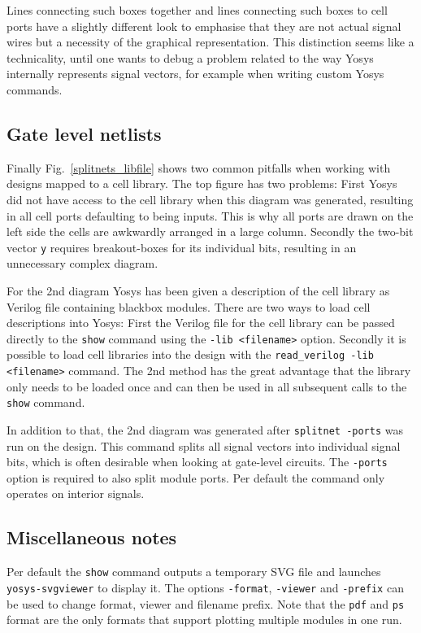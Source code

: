 \documentclass[9pt,technote,a4paper]{IEEEtran}
\begin{document}
Lines connecting such boxes together and lines connecting such boxes to cell
ports have a slightly different look to emphasise that they are not actual signal
wires but a necessity of the graphical representation. This distinction seems
like a technicality, until one wants to debug a problem related to the way
Yosys internally represents signal vectors, for example when writing custom
Yosys commands.

\subsection{Gate level netlists}

Finally Fig.~\ref{splitnets_libfile} shows two common pitfalls when working
with designs mapped to a cell library. The top figure has two problems: First
Yosys did not have access to the cell library when this diagram was generated,
resulting in all cell ports defaulting to being inputs. This is why all ports
are drawn on the left side the cells are awkwardly arranged in a large column.
Secondly the two-bit vector {\tt y} requires breakout-boxes for its individual
bits, resulting in an unnecessary complex diagram.

For the 2nd diagram Yosys has been given a description of the cell library as
Verilog file containing blackbox modules. There are two ways to load cell
descriptions into Yosys: First the Verilog file for the cell library can be
passed directly to the {\tt show} command using the {\tt -lib <filename>}
option. Secondly it is possible to load cell libraries into the design with
the {\tt read\_verilog -lib <filename>} command. The 2nd method has the great 
advantage that the library only needs to be loaded once and can then be used
in all subsequent calls to the {\tt show} command.

In addition to that, the 2nd diagram was generated after {\tt splitnet -ports}
was run on the design. This command splits all signal vectors into individual
signal bits, which is often desirable when looking at gate-level circuits. The
{\tt -ports} option is required to also split module ports. Per default the
command only operates on interior signals.

\subsection{Miscellaneous notes}

Per default the {\tt show} command outputs a temporary SVG file and launches
{\tt yosys-svgviewer} to display it. The options {\tt -format}, {\tt -viewer}
and {\tt -prefix} can be used to change format, viewer and filename prefix.
Note that the {\tt pdf} and {\tt ps} format are the only formats that support
plotting multiple modules in one run.
\end{document}
